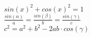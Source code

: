 $sin(x)^2 + cos(x)^2 = 1$\\
$\frac{sin(\alpha)}{a} = \frac{sin(\beta)}{b} = \frac{sin(\gamma)}{c}$\\
$c^2 = a^2 + b^2 -2ab \cdot cos(\gamma)$\\